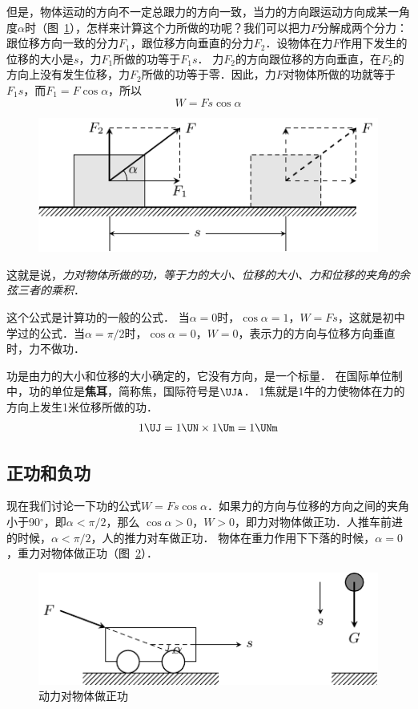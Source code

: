 但是，物体运动的方向不一定总跟力的方向一致，当力的方向跟运动方向成某一角度$\alpha$时（图~\ref{fig_A_7-2}），怎样来计算这个力所做的功呢？我们可以把力$F$分解成两个分力：跟位移方向一致的分力$F_1$，跟位移方向垂直的分力$F_2$．设物体在力$F$作用下发生的位移的大小是$s$，力$F_1$所做的功等于$F_1s$．
力$F_2$的方向跟位移的方向垂直，在$F_2$的方向上没有发生位移，力$F_2$所做的功等于零．因此，力$F$对物体所做的功就等于$F_1s$，而$F_1=F\cos\alpha$，所以
\[W=Fs\cos\alpha \]

\begin{figure}[htbp]
    \centering
    \includegraphics{fig/A/7-2.pdf}
    \caption{}\label{fig_A_7-2}
\end{figure}

这就是说，\textit{力对物体所做的功，等于力的大小、位移的大小、力和位移的夹角的余弦三者的乘积}．

这个公式是计算功的一般的公式．
当$\alpha=0$时，$\cos\alpha=1$，$W=Fs$，这就是初中学过的公式．当$\alpha=\pi/2$时，$\cos\alpha=0$，$W=0$，表示力的方向与位移方向垂直时，力不做功．

功是由力的大小和位移的大小确定的，它没有方向，是一个标量．
在国际单位制中，功的单位是\textbf{焦耳}，简称焦，国际符号是$\UJA$．
1焦就是1牛的力使物体在力的方向上发生1米位移所做的功．
\[1 \UJ=1 \UN \times 1 \Um=1 \UNm \]

\subsection{正功和负功} 

现在我们讨论一下功的公式$W=Fs\cos\alpha$．如果力的方向与位移的方向之间的夹角小于90$^\circ$，即$\alpha<\pi/2$，那么
$\cos\alpha>0$，$W>0$，即力对物体做正功．人推车前进的时候，$\alpha<\pi/2$，人的推力对车做正功．
物体在重力作用下下落的时候，$\alpha=0$，重力对物体做正功（图~\ref{fig_A_7-3}）．
\begin{figure}[htbp]
    \centering
    \includegraphics{fig/A/7-3.pdf}
    \caption{动力对物体做正功}\label{fig_A_7-3}
\end{figure}

